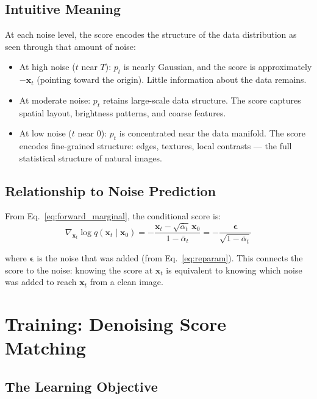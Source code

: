 \documentclass[11pt]{article}
\newcommand{\xb}{\mathbf{x}}
\newcommand{\eb}{\boldsymbol{\epsilon}}
\newcommand{\alphabar}{\bar{\alpha}}
\begin{document}
  \subsection{Intuitive Meaning}

  At each noise level, the score encodes the structure of the data
  distribution as seen through that amount of noise:

  \begin{itemize}[nosep]
      \item At high noise ($t$ near $T$): $p_t$ is nearly Gaussian, and the
            score is approximately $-\xb_t$ (pointing toward the origin).
            Little information about the data remains.
      \item At moderate noise: $p_t$ retains large-scale data structure.
            The score captures spatial layout, brightness patterns, and
            coarse features.
      \item At low noise ($t$ near $0$): $p_t$ is concentrated near the data
            manifold. The score encodes fine-grained structure: edges,
            textures, local contrasts --- the full statistical structure
            of natural images.
  \end{itemize}

  \subsection{Relationship to Noise Prediction}

  From Eq.~\eqref{eq:forward_marginal}, the conditional score is:
  \begin{equation}
      \nabla_{\xb_t} \log q(\xb_t \mid \xb_0)
      = -\frac{\xb_t - \sqrt{\alphabar_t}\, \xb_0}{1 - \alphabar_t}
      = -\frac{\eb}{\sqrt{1 - \alphabar_t}}
      \label{eq:score_noise}
  \end{equation}

  where $\eb$ is the noise that was added (from Eq.~\ref{eq:reparam}).
  This connects the score to the noise: knowing the score at $\xb_t$ is
  equivalent to knowing which noise was added to reach $\xb_t$ from a
  clean image.

  \section{Training: Denoising Score Matching}

  \subsection{The Learning Objective}
\end{document}
